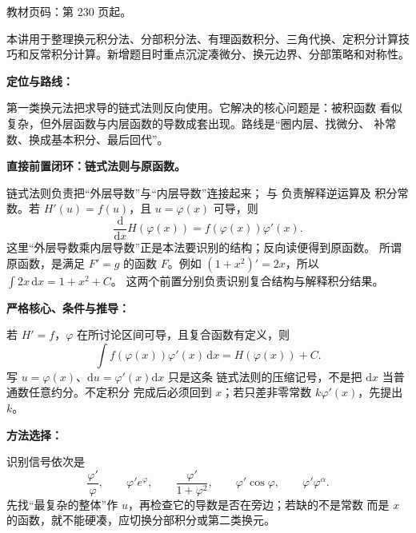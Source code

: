 
\begin{knowledgeBox}
教材页码：第 230 页起。

本讲用于整理换元积分法、分部积分法、有理函数积分、三角代换、定积分计算技巧和反常积分计算。新增题目时重点沉淀凑微分、换元边界、分部策略和对称性。
\end{knowledgeBox}


\par

\begin{knowledgeBox}
\textbf{定位与路线：}

第一类换元法把求导的链式法则反向使用。它解决的核心问题是：被积函数
看似复杂，但外层函数与内层函数的导数成套出现。路线是“圈内层、找微分、
补常数、换成基本积分、最后回代”。

\textbf{直接前置闭环：链式法则与原函数。}

链式法则负责把“外层导数”与“内层导数”连接起来；
与
负责解释逆运算及
积分常数。若 \(H'(u)=f(u)\)，且 \(u=\varphi(x)\) 可导，则
\[
\frac{\mathrm d}{\mathrm dx}H(\varphi(x))
=f(\varphi(x))\varphi'(x).
\]
这里“外层导数乘内层导数”正是本法要识别的结构；反向读便得到原函数。
所谓原函数，是满足 \(F'=g\) 的函数 \(F\)。例如
\((1+x^2)'=2x\)，所以 \(\int2x\,\mathrm dx=1+x^2+C\)。
这两个前置分别负责识别复合结构与解释积分结果。

\textbf{严格核心、条件与推导：}

若 \(H'=f\)，\(\varphi\) 在所讨论区间可导，且复合函数有定义，则
\[
\boxed{\int f(\varphi(x))\varphi'(x)\,\mathrm dx
=H(\varphi(x))+C.}
\]
写 \(u=\varphi(x)\)、\(\mathrm du=\varphi'(x)\mathrm dx\) 只是这条
链式法则的压缩记号，不是把 \(\mathrm dx\) 当普通数任意约分。不定积分
完成后必须回到 \(x\)；若只差非零常数 \(k\varphi'(x)\)，先提出 \(k\)。

\textbf{方法选择：}

识别信号依次是
\[
\frac{\varphi'}{\varphi},\qquad
\varphi'e^{\varphi},\qquad
\frac{\varphi'}{1+\varphi^2},\qquad
\varphi'\cos\varphi,\qquad
\varphi'\varphi^\alpha .
\]
先找“最复杂的整体”作 \(u\)，再检查它的导数是否在旁边；若缺的不是常数
而是 \(x\) 的函数，就不能硬凑，应切换分部积分或第二类换元。


\end{knowledgeBox}
